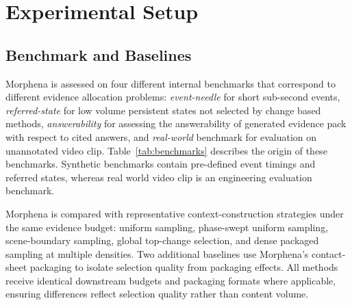 \documentclass[conference]{IEEEtran}
\begin{document}
\section{Experimental Setup}

\subsection{Benchmark and Baselines}

Morphena is assessed on four different internal benchmarks that correspond to different evidence allocation problems: \textit{event-needle} for short sub-second events, \textit{referred-state} for low volume persistent states not selected by change based methods, \textit{answerability} for assessing the answerability of generated evidence pack with respect to cited answers, and \textit{real-world} benchmark for evaluation on unannotated video clip. Table~\ref{tab:benchmarks} describes the origin of these benchmarks. Synthetic benchmarks contain pre-defined event timings and referred states, whereas real world video clip is an engineering evaluation benchmark.

\begin{table}[t]
\centering
\small
\caption{Benchmark sources used in Section~V.}
\label{tab:benchmarks}
\end{table}

Morphena is compared with representative context-construction strategies under the same evidence budget: uniform sampling, phase-swept uniform sampling, scene-boundary sampling, global top-change selection, and dense packaged sampling at multiple densities. Two additional baselines use Morphena's contact-sheet packaging to isolate selection quality from packaging effects. All methods receive identical downstream budgets and packaging formats where applicable, ensuring differences reflect selection quality rather than content volume.
\end{document}
